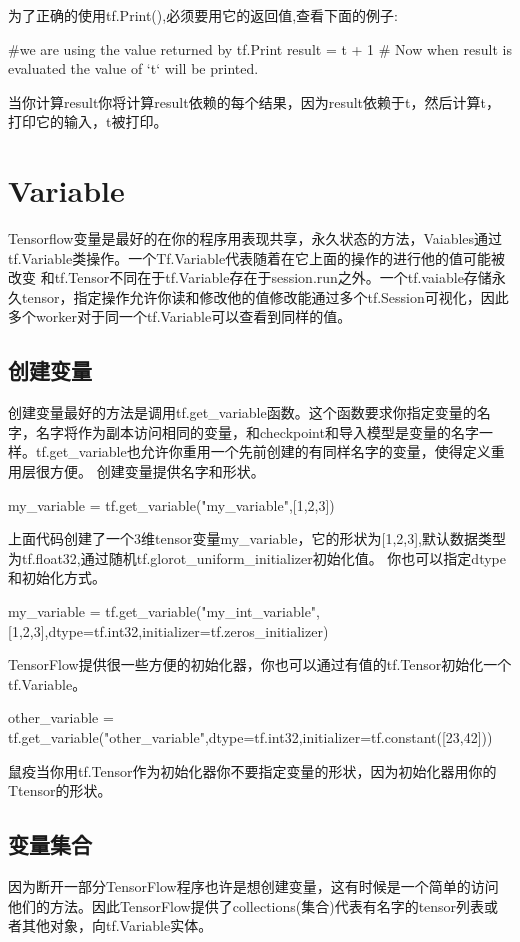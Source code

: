 为了正确的使用tf.Print(),必须要用它的返回值,查看下面的例子:
\begin{python}
	#we are using the value returned by tf.Print
result = t + 1  # Now when result is evaluated the value of `t` will be printed.
\end{python}
当你计算result你将计算result依赖的每个结果，因为result依赖于t，然后计算t，打印它的输入，t被打印。
\section{Variable}
Tensorflow变量是最好的在你的程序用表现共享，永久状态的方法，Vaiables通过tf.Variable类操作。一个Tf.Variable代表随着在它上面的操作的进行他的值可能被改变
和tf.Tensor不同在于tf.Variable存在于session.run之外。一个tf.vaiable存储永久tensor，指定操作允许你读和修改他的值修改能通过多个tf.Session可视化，因此多个worker对于同一个tf.Variable可以查看到同样的值。
\subsection{创建变量}
创建变量最好的方法是调用tf.get\_variable函数。这个函数要求你指定变量的名字，名字将作为副本访问相同的变量，和checkpoint和导入模型是变量的名字一样。tf.get\_variable也允许你重用一个先前创建的有同样名字的变量，使得定义重用层很方便。
创建变量提供名字和形状。
\begin{python}
	my_variable = tf.get_variable("my_variable",[1,2,3])
\end{python}
上面代码创建了一个3维tensor变量my\_variable，它的形状为[1,2,3],默认数据类型为tf.float32,通过随机tf.glorot\_uniform\_initializer初始化值。
你也可以指定dtype和初始化方式。
\begin{python}
	my_variable = tf.get_variable("my_int_variable",[1,2,3],dtype=tf.int32,initializer=tf.zeros_initializer)
\end{python}
TensorFlow提供很一些方便的初始化器，你也可以通过有值的tf.Tensor初始化一个tf.Variable。
\begin{python}
	other_variable = tf.get_variable("other_variable",dtype=tf.int32,initializer=tf.constant([23,42]))
\end{python}
鼠疫当你用tf.Tensor作为初始化器你不要指定变量的形状，因为初始化器用你的Ttensor的形状。
\subsection{变量集合}
因为断开一部分TensorFlow程序也许是想创建变量，这有时候是一个简单的访问他们的方法。因此TensorFlow提供了collections(集合)代表有名字的tensor列表或者其他对象，向tf.Variable实体。

